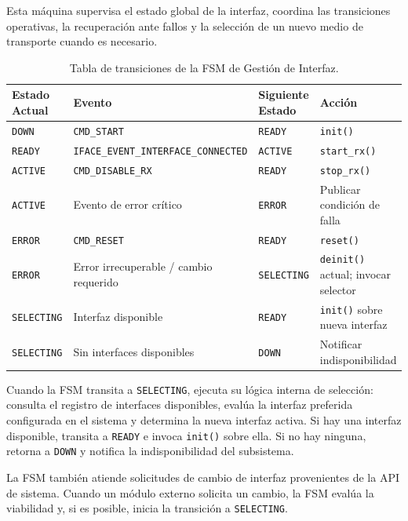 Esta máquina supervisa el estado global de la interfaz, coordina las transiciones operativas, la recuperación ante fallos y la selección de un nuevo medio de transporte
cuando es necesario.

\begin{table}[htbp]
    \centering
    \caption{Tabla de transiciones de la FSM de Gestión de Interfaz.}
    \label{tab:fsm-gestion}
    \begin{tabular}{llll}
        \toprule
        \textbf{Estado Actual} & \textbf{Evento} & \textbf{Siguiente Estado} & \textbf{Acción} \\
        \midrule
        \texttt{DOWN}      & \texttt{CMD\_START} & \texttt{READY} & \texttt{init()} \\
        \texttt{READY}     & \texttt{IFACE\_EVENT\_INTERFACE\_CONNECTED} & \texttt{ACTIVE} & \texttt{start\_rx()} \\
        \texttt{ACTIVE}    & \texttt{CMD\_DISABLE\_RX} & \texttt{READY} & \texttt{stop\_rx()} \\
        \texttt{ACTIVE}    & Evento de error crítico & \texttt{ERROR} & Publicar condición de falla \\
        \texttt{ERROR}     & \texttt{CMD\_RESET} & \texttt{READY} & \texttt{reset()} \\
        \texttt{ERROR}     & Error irrecuperable / cambio requerido & \texttt{SELECTING} & \texttt{deinit()} actual; invocar selector \\
        \texttt{SELECTING} & Interfaz disponible & \texttt{READY} & \texttt{init()} sobre nueva interfaz \\
        \texttt{SELECTING} & Sin interfaces disponibles & \texttt{DOWN} & Notificar indisponibilidad \\
        \bottomrule
    \end{tabular}
\end{table}

Cuando la FSM transita a \texttt{SELECTING}, ejecuta su lógica interna de selección: consulta el registro de interfaces disponibles, evalúa la interfaz preferida configurada en el sistema y determina la nueva interfaz activa. Si hay una interfaz disponible, transita a \texttt{READY} e invoca \texttt{init()} sobre ella. Si no hay ninguna, retorna a \texttt{DOWN} y notifica la indisponibilidad del subsistema.

La FSM también atiende solicitudes de cambio de interfaz provenientes de la API de sistema. Cuando un módulo externo solicita un cambio, la FSM evalúa la viabilidad y, si es posible, inicia la transición a \texttt{SELECTING}.

